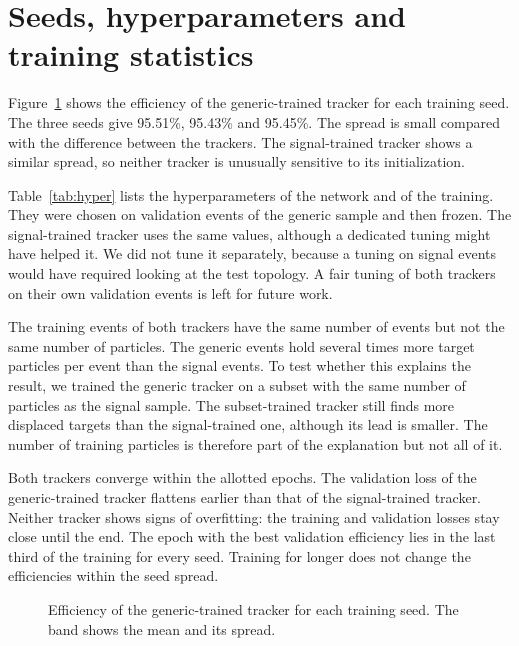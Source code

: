 \section{Seeds, hyperparameters and training statistics}
\label{app:seeds}

Figure~\ref{fig:seeds} shows the efficiency of the generic-trained tracker for each training seed.
The three seeds give 95.51\%, 95.43\% and 95.45\%.
The spread is small compared with the difference between the trackers.
The signal-trained tracker shows a similar spread, so neither tracker is unusually sensitive to its initialization.

Table~\ref{tab:hyper} lists the hyperparameters of the network and of the training.
They were chosen on validation events of the generic sample and then frozen.
The signal-trained tracker uses the same values, although a dedicated tuning might have helped it.
We did not tune it separately, because a tuning on signal events would have required looking at the test topology.
A fair tuning of both trackers on their own validation events is left for future work.

The training events of both trackers have the same number of events but not the same number of particles.
The generic events hold several times more target particles per event than the signal events.
To test whether this explains the result, we trained the generic tracker on a subset with the same number of particles as the signal sample.
The subset-trained tracker still finds more displaced targets than the signal-trained one, although its lead is smaller.
The number of training particles is therefore part of the explanation but not all of it.

Both trackers converge within the allotted epochs.
The validation loss of the generic-trained tracker flattens earlier than that of the signal-trained tracker.
Neither tracker shows signs of overfitting: the training and validation losses stay close until the end.
The epoch with the best validation efficiency lies in the last third of the training for every seed.
Training for longer does not change the efficiencies within the seed spread.

\begin{figure}[tbp]
  \centering
  \caption{Efficiency of the generic-trained tracker for each training seed. The band shows the mean and its spread.}
  \label{fig:seeds}
\end{figure}

